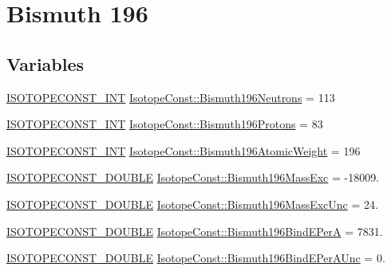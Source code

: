 \hypertarget{group___isotope_const-_bismuth-_bi196}{}\section{Bismuth 196}
\label{group___isotope_const-_bismuth-_bi196}
\subsection*{Variables}
\begin{DoxyCompactItemize}
\item 
\mbox{\hyperlink{group___isotope_const-_macros_ga5f18360b3e99483a35c32d789e62621c}{I\+S\+O\+T\+O\+P\+E\+C\+O\+N\+S\+T\+\_\+\+I\+NT}} \mbox{\hyperlink{group___isotope_const-_bismuth-_bi196_ga59682d100f06f5aa3e80fa5c7b7aee77}{Isotope\+Const\+::\+Bismuth196\+Neutrons}} = 113
\item 
\mbox{\hyperlink{group___isotope_const-_macros_ga5f18360b3e99483a35c32d789e62621c}{I\+S\+O\+T\+O\+P\+E\+C\+O\+N\+S\+T\+\_\+\+I\+NT}} \mbox{\hyperlink{group___isotope_const-_bismuth-_bi196_gae87582ea49120ceafc5a22f8429ff24a}{Isotope\+Const\+::\+Bismuth196\+Protons}} = 83
\item 
\mbox{\hyperlink{group___isotope_const-_macros_ga5f18360b3e99483a35c32d789e62621c}{I\+S\+O\+T\+O\+P\+E\+C\+O\+N\+S\+T\+\_\+\+I\+NT}} \mbox{\hyperlink{group___isotope_const-_bismuth-_bi196_gac846d6cce27ac636a122d6ed6cbeddf4}{Isotope\+Const\+::\+Bismuth196\+Atomic\+Weight}} = 196
\item 
\mbox{\hyperlink{group___isotope_const-_macros_ga8f45a7272ce02c0b4c65c44636ed719a}{I\+S\+O\+T\+O\+P\+E\+C\+O\+N\+S\+T\+\_\+\+D\+O\+U\+B\+LE}} \mbox{\hyperlink{group___isotope_const-_bismuth-_bi196_ga72bc23081c5111ae2d0d1ef3a8d42874}{Isotope\+Const\+::\+Bismuth196\+Mass\+Exc}} = -\/18009.
\item 
\mbox{\hyperlink{group___isotope_const-_macros_ga8f45a7272ce02c0b4c65c44636ed719a}{I\+S\+O\+T\+O\+P\+E\+C\+O\+N\+S\+T\+\_\+\+D\+O\+U\+B\+LE}} \mbox{\hyperlink{group___isotope_const-_bismuth-_bi196_ga23ce9dd66429237b53f99437f1917465}{Isotope\+Const\+::\+Bismuth196\+Mass\+Exc\+Unc}} = 24.
\item 
\mbox{\hyperlink{group___isotope_const-_macros_ga8f45a7272ce02c0b4c65c44636ed719a}{I\+S\+O\+T\+O\+P\+E\+C\+O\+N\+S\+T\+\_\+\+D\+O\+U\+B\+LE}} \mbox{\hyperlink{group___isotope_const-_bismuth-_bi196_ga6c7bbef767b1ac3bcddb12d4a1326c4e}{Isotope\+Const\+::\+Bismuth196\+Bind\+E\+PerA}} = 7831.
\item 
\mbox{\hyperlink{group___isotope_const-_macros_ga8f45a7272ce02c0b4c65c44636ed719a}{I\+S\+O\+T\+O\+P\+E\+C\+O\+N\+S\+T\+\_\+\+D\+O\+U\+B\+LE}} \mbox{\hyperlink{group___isotope_const-_bismuth-_bi196_gad596386126283137896fe2ab841aaa86}{Isotope\+Const\+::\+Bismuth196\+Bind\+E\+Per\+A\+Unc}} = 0.

\end{DoxyCompactItemize}
